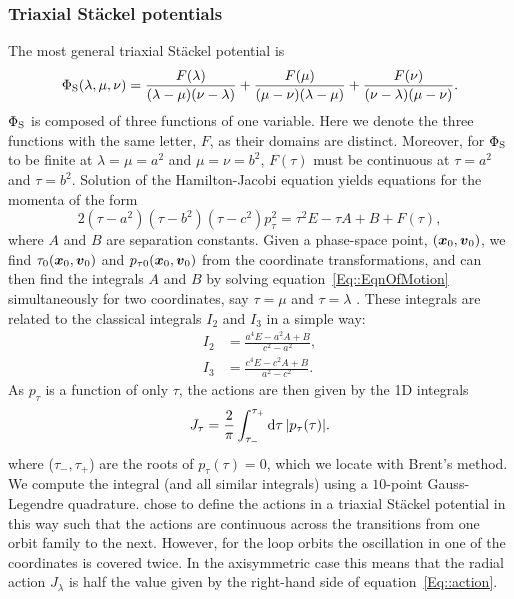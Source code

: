 \documentclass[useAMS,usenatbib,fleqn,a4paper]{mn2e}
\begin{document}
\subsubsection{Triaxial St\"ackel potentials}

The most general triaxial St\"ackel potential is
\begin{equation}
\Phi_{\rm S}(\lambda,\mu,\nu) = \frac{F(\lambda)}{(\lambda-\mu)(\nu-\lambda)}+\frac{F(\mu)}{(\mu-\nu)(\lambda-\mu)}+\frac{F(\nu)}{(\nu-\lambda)(\mu-\nu)}.
\end{equation}
$\Phi_{\rm S}$ is composed of three functions of one variable. Here we denote the
three functions with the same letter, $F$, as their domains are distinct.
Moreover, for $\Phi_{\rm S}$ to be finite at $\lambda=\mu=a^2$ and
$\mu=\nu=b^2$, $F(\tau)$ must be continuous at $\tau=a^2$ and $\tau=b^2$.
Solution of  the Hamilton-Jacobi equation
\citep{deZeeuw1985a} yields equations for the momenta of the form
\begin{equation}
2(\tau-a^2)(\tau-b^2)(\tau-c^2)p_\tau^2=\tau^2 E -\tau A+B + F(\tau),
\label{Eq::EqnOfMotion}
\end{equation}
 where $A$ and $B$ are separation constants.  Given a phase-space
point, $(\vx_0,\vv_0)$, we find $\tau_0(\vx_0,\vv_0)$ and $p_{\tau
0}(\vx_0,\vv_0)$ from  the coordinate transformations, and can then find the
integrals $A$ and $B$ by solving equation~\eqref{Eq::EqnOfMotion} simultaneously
for two coordinates, say $\tau=\mu$ and $\tau=\lambda$ \citep[see][for more details]{deZeeuw1985a}. These integrals are related to
the classical integrals $I_2$ and $I_3$ in a simple way:
\begin{equation}
\begin{split}
I_2&=\frac{a^4 E-a^2 A+B}{c^2-a^2},\\
I_3&=\frac{c^4E-c^2 A+B}{a^2-c^2}.
\end{split}
\end{equation}
As $p_\tau$ is a function of  only $\tau$, the actions are then given by the
1D integrals
\begin{equation}
J_\tau = \frac{2}{\pi}\int_{\tau_-}^{\tau_+} \mathrm{d}\tau\,|p_\tau(\tau)|.
\label{Eq::action}
\end{equation}
where ($\tau_-,\tau_+$) are the roots of $p_\tau(\tau)=0$, which we locate
with Brent's method. We compute the integral (and all similar integrals) using a $10$-point Gauss-Legendre
quadrature. \cite{deZeeuw1985a} chose to define the actions in a triaxial St\"ackel potential in this way such that the actions are continuous across the transitions from one orbit family to the next. However, for the loop orbits the oscillation in one of the coordinates is covered twice. In the axisymmetric case this means that the radial action $J_\lambda$ is half the value given by the right-hand side of equation~\eqref{Eq::action}.
\end{document}
